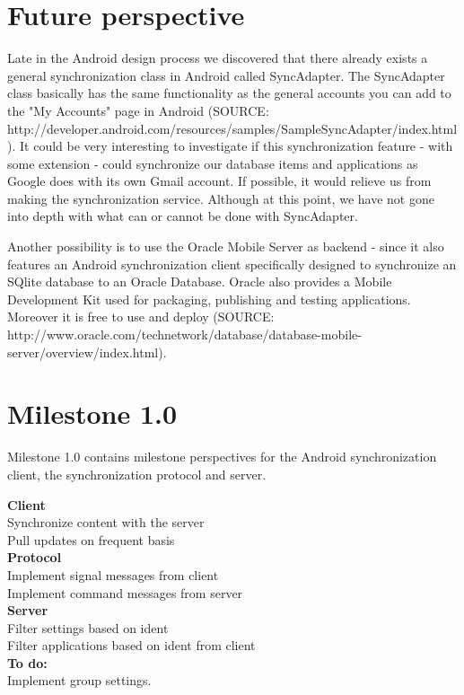 \section{Future perspective}
Late in the Android design process we discovered that there already exists a general synchronization class in Android called SyncAdapter. The SyncAdapter class basically has the same functionality as the general accounts you can add to the "My Accounts" page in Android (SOURCE: http://developer.android.com/resources/samples/SampleSyncAdapter/index.html). It could be very interesting to investigate if this synchronization feature - with some extension - could synchronize our database items and applications as Google does with its own Gmail account. If possible, it would relieve us from making the synchronization service. Although at this point, we have not gone into depth with what can or cannot be done with SyncAdapter. 

Another possibility is to use the Oracle Mobile Server as backend - since it also features an Android synchronization client specifically designed to synchronize an SQlite database to an Oracle Database. Oracle also provides a Mobile Development Kit used for packaging, publishing and testing applications. Moreover it is free to use and deploy (SOURCE: http://www.oracle.com/technetwork/database/database-mobile-server/overview/index.html).  

\section{Milestone 1.0}
Milestone 1.0 contains milestone perspectives for the Android synchronization client, the synchronization protocol and server.  

\textbf{Client}\\
Synchronize content with the server\\
Pull updates on frequent basis\\

\textbf{Protocol}\\
Implement signal messages from client\\
Implement command messages from server\\

\textbf{Server}\\
Filter settings based on ident\\
Filter applications based on ident from client\\

\textbf{To do:}\\
Implement group settings.  
